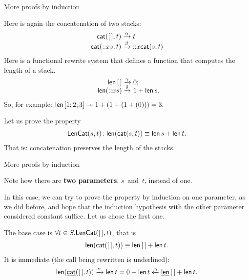 %
\begin{frame}{More proofs by induction}

  Here is again the concatenation of two stacks:
  \begin{align*}
    \textsf{cat}(        [\,],t) &\xrightarrow{\alpha} t\\
    \textsf{cat}(\textsf{::}{x}{s},t) &\xrightarrow{\smash{\beta}}
    \textsf{::}{x}{\textsf{cat}(s,t)}
  \end{align*}
  Here is a functional rewrite system that defines a function
   that computes the length of a stack.
  \begin{equation*}
    \begin{array}{r@{\;}l@{\;}l@{}}
      \fun{len}\,\el & \smashedrightarrow{\gamma} & 0;\\
      \fun{len}(\cons{x}{s}) & \smashedrightarrow{\delta}
      & 1 + \fun{len}\, s.
    \end{array}
  \end{equation*}
  So, for example: \(\textsf{len}\,[1;2;3] \twoheadrightarrow 1 + (1 + (1
  + (0))) = 3.\)

  \bigskip

  Let us prove the property
  \begin{equation*}
    \textsf{LenCat}({s,t}) \colon \textsf{len}(\textsf{cat}(s, t)) \equiv
    \textsf{len}\,s + \textsf{len}\,t.
  \end{equation*}
  That is: concatenation preserves the length of the stacks.

\end{frame}

%
\begin{frame}{More proofs by induction}

  Note how there are \textbf{two parameters}, \(s\)~and~\(t\), instead
  of one.

  \bigskip

  In this case, we can try to prove the property by induction on one
  parameter, as we did before, and hope that the induction hypothesis
  with the other parameter considered constant suffice. Let us chose
  the first one.

  \bigskip

  The base case is \(\forall t \in S.\textsf{LenCat}({[\,],t})\), that is
  \[\textsf{len}(\textsf{cat}([\,],t)) \equiv \textsf{len}\,[\,] +
  \textsf{len}\,t.\] It is immediate (the call being rewritten is
  underlined):
  \begin{equation*}
    \textsf{len}(\underline{\textsf{cat}}([\,],t)) \xrightarrow{\smash{\alpha}}
    \textsf{len}\,t = 0 + \textsf{len}\,t
    \xleftarrow{\smash{\gamma}} \underline{\textsf{len}}\,[\,] + \textsf{len}\,t.
  \end{equation*}

\end{frame}

